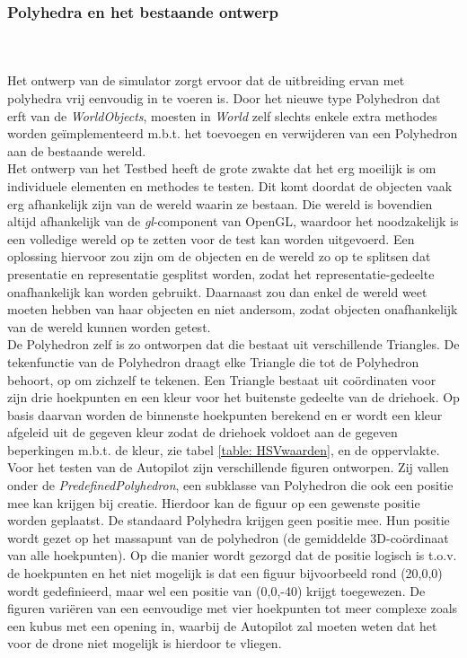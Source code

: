 \subsubsection{Polyhedra en het bestaande ontwerp}
\\\\
Het ontwerp van de simulator zorgt ervoor dat de uitbreiding ervan met polyhedra vrij eenvoudig in te voeren is. Door het nieuwe type Polyhedron dat erft van de \textit{WorldObjects}, moesten in \textit{World} zelf slechts enkele extra methodes worden ge\"implementeerd m.b.t. het toevoegen en verwijderen van een Polyhedron aan de bestaande wereld.\\
\noindent
Het ontwerp van het Testbed heeft de grote zwakte dat het erg moeilijk is om individuele elementen en methodes te testen. Dit komt doordat de objecten vaak erg afhankelijk zijn van de wereld waarin ze bestaan. Die wereld is bovendien altijd afhankelijk van de \textit{gl}-component van OpenGL, waardoor het noodzakelijk is een volledige wereld op te zetten voor de test kan worden uitgevoerd. Een oplossing hiervoor zou zijn om de objecten en de wereld zo op te splitsen dat presentatie en representatie gesplitst worden, zodat het representatie-gedeelte onafhankelijk kan worden gebruikt. Daarnaast zou dan enkel de wereld weet moeten hebben van haar objecten en niet andersom, zodat objecten onafhankelijk van de wereld kunnen worden getest.\\

\noindent 
De Polyhedron zelf is zo ontworpen dat die bestaat uit verschillende Triangles. De tekenfunctie van de Polyhedron draagt elke Triangle die tot de Polyhedron behoort, op om zichzelf te tekenen. Een Triangle bestaat uit co\"ordinaten voor zijn drie hoekpunten en een kleur voor het buitenste gedeelte van de driehoek. Op basis daarvan worden de binnenste hoekpunten berekend en er wordt een kleur afgeleid uit de gegeven kleur zodat de driehoek voldoet aan de gegeven beperkingen m.b.t. de kleur, zie tabel \ref{table: HSVwaarden}, en de oppervlakte.\\
\noindent
Voor het testen van de Autopilot zijn verschillende figuren ontworpen. Zij vallen onder de \textit{PredefinedPolyhedron}, een subklasse van Polyhedron die ook een positie mee kan krijgen bij creatie. Hierdoor kan de figuur op een gewenste positie worden geplaatst. De standaard Polyhedra krijgen geen positie mee. Hun positie wordt gezet op het massapunt van de polyhedron (de gemiddelde 3D-co\"ordinaat van alle hoekpunten). Op die manier wordt gezorgd dat de positie logisch is t.o.v. de hoekpunten en het niet mogelijk is dat een figuur bijvoorbeeld rond (20,0,0) wordt gedefinieerd, maar wel een positie van (0,0,-40) krijgt toegewezen. De figuren vari\"eren van een eenvoudige met vier hoekpunten tot meer complexe zoals een kubus met een opening in, waarbij de Autopilot zal moeten weten dat het voor de drone niet mogelijk is hierdoor te vliegen.

